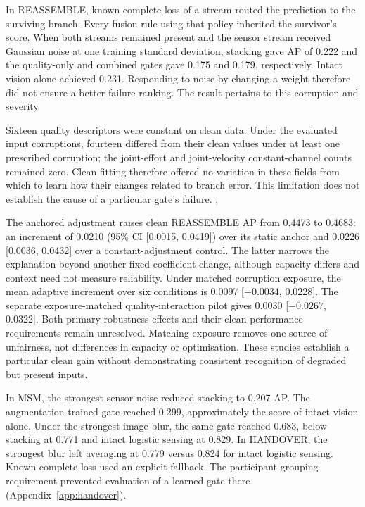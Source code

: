 In REASSEMBLE, known complete loss of a stream routed the prediction to the surviving
branch. Every fusion rule using that policy inherited the survivor's score. When both
streams remained present and the sensor stream received Gaussian noise at one training
standard deviation, stacking gave AP of 0.222 and the quality-only and combined gates
gave 0.175 and 0.179, respectively. Intact vision alone achieved 0.231. Responding to noise
by changing a weight therefore did not ensure a better failure ranking. The result
pertains to this corruption and severity.

Sixteen quality descriptors were constant on clean data. Under the evaluated input corruptions, fourteen differed from their clean values under at least one prescribed
corruption; the joint-effort and joint-velocity constant-channel counts remained zero.
Clean fitting therefore offered no variation in these fields from which to learn how
their changes related to branch error. This limitation does not establish the cause of
a particular gate's failure.
{, }

The anchored adjustment raises clean REASSEMBLE AP from 0.4473 to 0.4683: an increment of
0.0210 (95\% CI [0.0015, 0.0419]) over its static anchor and 0.0226 [0.0036, 0.0432] over a
constant-adjustment control. The latter narrows the explanation beyond another fixed
coefficient change, although capacity differs and context need not measure reliability.
Under matched corruption exposure, the mean adaptive increment over six conditions is
0.0097 [$-0.0034$, 0.0228]. The separate exposure-matched quality-interaction pilot gives
0.0030 [$-0.0267$, 0.0322]. Both primary robustness effects and their clean-performance
requirements remain unresolved. Matching exposure removes one source of unfairness, not
differences in capacity or optimisation. These studies establish a particular clean gain
without demonstrating consistent recognition of degraded but present inputs.

In MSM, the strongest sensor noise reduced stacking to 0.207 AP. The augmentation-trained
gate reached 0.299, approximately the score of intact vision alone. Under the strongest
image blur, the same gate reached 0.683, below stacking at 0.771 and intact logistic
sensing at 0.829. In HANDOVER, the strongest blur left averaging at 0.779 versus 0.824 for
intact logistic sensing. Known complete loss used an explicit fallback. The participant
grouping requirement prevented evaluation of a learned gate there
(Appendix~\ref{app:handover}).

